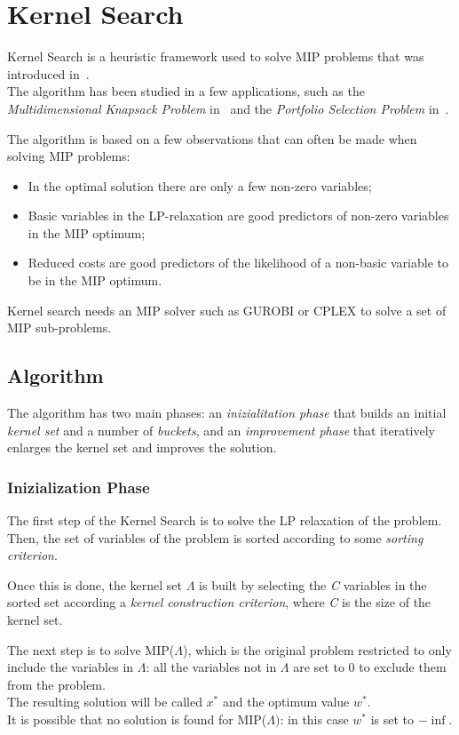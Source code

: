 \chapter{Kernel Search}\label{ch:kernel-search}
Kernel Search is a heuristic framework used to solve MIP problems that was introduced in~\cite{kernel:2007}.\\
The algorithm has been studied in a few applications, such as the \textit{Multidimensional Knapsack Problem}
in~\cite{kernel:2010} and the \textit{Portfolio Selection Problem} in~\cite{kernel:2012}.

The algorithm is based on a few observations that can often be made when solving MIP problems:
\begin{itemize}
    \item In the optimal solution there are only a few non-zero variables;
    \item Basic variables in the LP-relaxation are good predictors of non-zero variables in the MIP optimum;
    \item Reduced costs are good predictors of the likelihood of a non-basic variable to be in the MIP optimum.
\end{itemize}

Kernel search needs an MIP solver such as GUROBI or CPLEX to solve a set of MIP sub-problems.


\section{Algorithm}
The algorithm has two main phases: an \textit{inizialitation phase}
that builds an initial \textit{kernel set} and a number of \textit{buckets},
and an \textit{improvement phase} that iteratively enlarges the kernel set and improves the solution.

\subsection{Inizialization Phase}
The first step of the Kernel Search is to solve the LP relaxation of the problem.\\
Then, the set of variables of the problem is sorted according to some \textit{sorting criterion}.

Once this is done, the kernel set \(\Lambda\) is built by selecting the \textit{C}
variables in the sorted set according a \textit{kernel construction criterion},
where \textit{C} is the size of the kernel set.

The next step is to solve MIP(\(\Lambda\)),
which is the original problem restricted to only include the variables in \(\Lambda\):
all the variables not in \(\Lambda\) are set to 0 to exclude them from the problem.\\
The resulting solution will be called \(x^{*}\) and the optimum value \(w^{*}\).\\
It is possible that no solution is found for MIP(\(\Lambda)\): in this case \(w^{*}\) is set to \(-\inf\).

